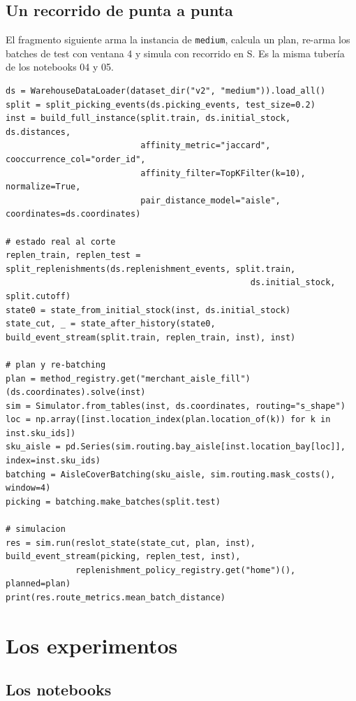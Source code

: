 \documentclass[11pt,a4paper,oneside]{report}
\newcommand{\code}[1]{\texttt{\small #1}}
\begin{document}
\section{Un recorrido de punta a punta}

El fragmento siguiente arma la instancia de \code{medium}, calcula un plan, re-arma los
batches de test con ventana 4 y simula con recorrido en S. Es la misma tubería de los
notebooks 04 y 05.

\begin{lstlisting}
ds = WarehouseDataLoader(dataset_dir("v2", "medium")).load_all()
split = split_picking_events(ds.picking_events, test_size=0.2)
inst = build_full_instance(split.train, ds.initial_stock, ds.distances,
                           affinity_metric="jaccard", cooccurrence_col="order_id",
                           affinity_filter=TopKFilter(k=10), normalize=True,
                           pair_distance_model="aisle", coordinates=ds.coordinates)

# estado real al corte
replen_train, replen_test = split_replenishments(ds.replenishment_events, split.train,
                                                 ds.initial_stock, split.cutoff)
state0 = state_from_initial_stock(inst, ds.initial_stock)
state_cut, _ = state_after_history(state0, build_event_stream(split.train, replen_train, inst), inst)

# plan y re-batching
plan = method_registry.get("merchant_aisle_fill")(ds.coordinates).solve(inst)
sim = Simulator.from_tables(inst, ds.coordinates, routing="s_shape")
loc = np.array([inst.location_index(plan.location_of(k)) for k in inst.sku_ids])
sku_aisle = pd.Series(sim.routing.bay_aisle[inst.location_bay[loc]], index=inst.sku_ids)
batching = AisleCoverBatching(sku_aisle, sim.routing.mask_costs(), window=4)
picking = batching.make_batches(split.test)

# simulacion
res = sim.run(reslot_state(state_cut, plan, inst), build_event_stream(picking, replen_test, inst),
              replenishment_policy_registry.get("home")(), planned=plan)
print(res.route_metrics.mean_batch_distance)
\end{lstlisting}

\chapter{Los experimentos}
\label{cap:experimentos}

\section{Los notebooks}
\end{document}
